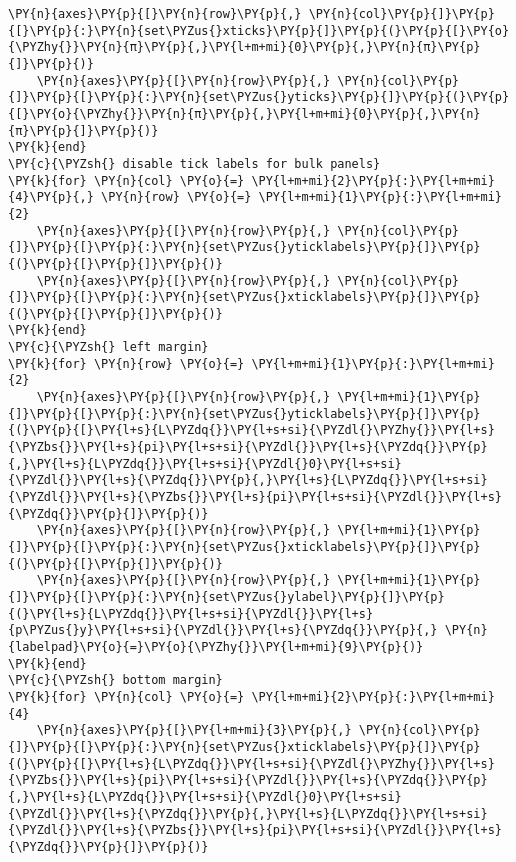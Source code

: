 \begin{Verbatim}[commandchars=\\\{\}]
    \PY{n}{axes}\PY{p}{[}\PY{n}{row}\PY{p}{,} \PY{n}{col}\PY{p}{]}\PY{p}{[}\PY{p}{:}\PY{n}{set\PYZus{}xticks}\PY{p}{]}\PY{p}{(}\PY{p}{[}\PY{o}{\PYZhy{}}\PY{n}{π}\PY{p}{,}\PY{l+m+mi}{0}\PY{p}{,}\PY{n}{π}\PY{p}{]}\PY{p}{)}
    \PY{n}{axes}\PY{p}{[}\PY{n}{row}\PY{p}{,} \PY{n}{col}\PY{p}{]}\PY{p}{[}\PY{p}{:}\PY{n}{set\PYZus{}yticks}\PY{p}{]}\PY{p}{(}\PY{p}{[}\PY{o}{\PYZhy{}}\PY{n}{π}\PY{p}{,}\PY{l+m+mi}{0}\PY{p}{,}\PY{n}{π}\PY{p}{]}\PY{p}{)}
\PY{k}{end}
\PY{c}{\PYZsh{} disable tick labels for bulk panels}
\PY{k}{for} \PY{n}{col} \PY{o}{=} \PY{l+m+mi}{2}\PY{p}{:}\PY{l+m+mi}{4}\PY{p}{,} \PY{n}{row} \PY{o}{=} \PY{l+m+mi}{1}\PY{p}{:}\PY{l+m+mi}{2}
    \PY{n}{axes}\PY{p}{[}\PY{n}{row}\PY{p}{,} \PY{n}{col}\PY{p}{]}\PY{p}{[}\PY{p}{:}\PY{n}{set\PYZus{}yticklabels}\PY{p}{]}\PY{p}{(}\PY{p}{[}\PY{p}{]}\PY{p}{)}
    \PY{n}{axes}\PY{p}{[}\PY{n}{row}\PY{p}{,} \PY{n}{col}\PY{p}{]}\PY{p}{[}\PY{p}{:}\PY{n}{set\PYZus{}xticklabels}\PY{p}{]}\PY{p}{(}\PY{p}{[}\PY{p}{]}\PY{p}{)}
\PY{k}{end}
\PY{c}{\PYZsh{} left margin}
\PY{k}{for} \PY{n}{row} \PY{o}{=} \PY{l+m+mi}{1}\PY{p}{:}\PY{l+m+mi}{2}
    \PY{n}{axes}\PY{p}{[}\PY{n}{row}\PY{p}{,} \PY{l+m+mi}{1}\PY{p}{]}\PY{p}{[}\PY{p}{:}\PY{n}{set\PYZus{}yticklabels}\PY{p}{]}\PY{p}{(}\PY{p}{[}\PY{l+s}{L\PYZdq{}}\PY{l+s+si}{\PYZdl{}\PYZhy{}}\PY{l+s}{\PYZbs{}}\PY{l+s}{pi}\PY{l+s+si}{\PYZdl{}}\PY{l+s}{\PYZdq{}}\PY{p}{,}\PY{l+s}{L\PYZdq{}}\PY{l+s+si}{\PYZdl{}0}\PY{l+s+si}{\PYZdl{}}\PY{l+s}{\PYZdq{}}\PY{p}{,}\PY{l+s}{L\PYZdq{}}\PY{l+s+si}{\PYZdl{}}\PY{l+s}{\PYZbs{}}\PY{l+s}{pi}\PY{l+s+si}{\PYZdl{}}\PY{l+s}{\PYZdq{}}\PY{p}{]}\PY{p}{)}
    \PY{n}{axes}\PY{p}{[}\PY{n}{row}\PY{p}{,} \PY{l+m+mi}{1}\PY{p}{]}\PY{p}{[}\PY{p}{:}\PY{n}{set\PYZus{}xticklabels}\PY{p}{]}\PY{p}{(}\PY{p}{[}\PY{p}{]}\PY{p}{)}
    \PY{n}{axes}\PY{p}{[}\PY{n}{row}\PY{p}{,} \PY{l+m+mi}{1}\PY{p}{]}\PY{p}{[}\PY{p}{:}\PY{n}{set\PYZus{}ylabel}\PY{p}{]}\PY{p}{(}\PY{l+s}{L\PYZdq{}}\PY{l+s+si}{\PYZdl{}}\PY{l+s}{p\PYZus{}y}\PY{l+s+si}{\PYZdl{}}\PY{l+s}{\PYZdq{}}\PY{p}{,} \PY{n}{labelpad}\PY{o}{=}\PY{o}{\PYZhy{}}\PY{l+m+mi}{9}\PY{p}{)}
\PY{k}{end}
\PY{c}{\PYZsh{} bottom margin}
\PY{k}{for} \PY{n}{col} \PY{o}{=} \PY{l+m+mi}{2}\PY{p}{:}\PY{l+m+mi}{4}
    \PY{n}{axes}\PY{p}{[}\PY{l+m+mi}{3}\PY{p}{,} \PY{n}{col}\PY{p}{]}\PY{p}{[}\PY{p}{:}\PY{n}{set\PYZus{}xticklabels}\PY{p}{]}\PY{p}{(}\PY{p}{[}\PY{l+s}{L\PYZdq{}}\PY{l+s+si}{\PYZdl{}\PYZhy{}}\PY{l+s}{\PYZbs{}}\PY{l+s}{pi}\PY{l+s+si}{\PYZdl{}}\PY{l+s}{\PYZdq{}}\PY{p}{,}\PY{l+s}{L\PYZdq{}}\PY{l+s+si}{\PYZdl{}0}\PY{l+s+si}{\PYZdl{}}\PY{l+s}{\PYZdq{}}\PY{p}{,}\PY{l+s}{L\PYZdq{}}\PY{l+s+si}{\PYZdl{}}\PY{l+s}{\PYZbs{}}\PY{l+s}{pi}\PY{l+s+si}{\PYZdl{}}\PY{l+s}{\PYZdq{}}\PY{p}{]}\PY{p}{)}

\end{Verbatim}
